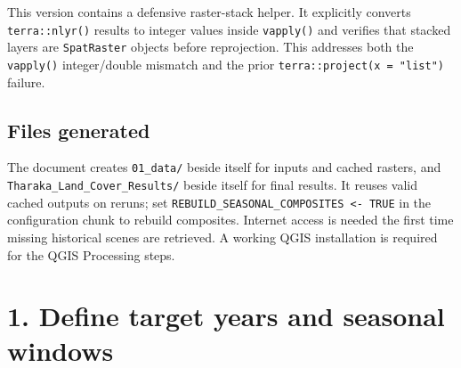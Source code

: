 \documentclass[
]{article}
\begin{document}
This version contains a defensive raster-stack helper. It explicitly
converts \texttt{terra::nlyr()} results to integer values inside
\texttt{vapply()} and verifies that stacked layers are
\texttt{SpatRaster} objects before reprojection. This addresses both the
\texttt{vapply()} integer/double mismatch and the prior
\texttt{terra::project(x\ =\ "list")} failure.

\subsection{Files generated}\label{files-generated}

The document creates \texttt{01\_data/} beside itself for inputs and
cached rasters, and \texttt{Tharaka\_Land\_Cover\_Results/} beside
itself for final results. It reuses valid cached outputs on reruns; set
\texttt{REBUILD\_SEASONAL\_COMPOSITES\ \textless{}-\ TRUE} in the
configuration chunk to rebuild composites. Internet access is needed the
first time missing historical scenes are retrieved. A working QGIS
installation is required for the QGIS Processing steps.

\section{1. Define target years and seasonal
windows}\label{define-target-years-and-seasonal-windows}
\end{document}
